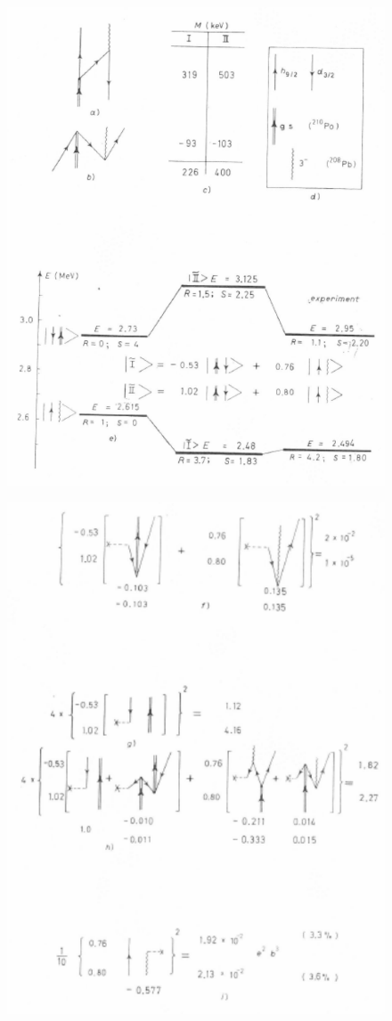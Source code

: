          \begin{figure}
         \centerline {
         \includegraphics*[width=12cm]{introduccion/figs/fig24a}
         }
         \end{figure}
              \begin{figure}
              \centerline {
              \includegraphics*[width=12cm]{introduccion/figs/fig24b}
              }
              \end{figure}
